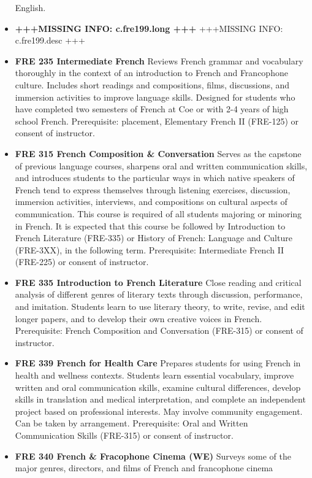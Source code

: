 \documentclass[
  letterpaper,
]{scrbook}
\begin{document}
\begin{itemize}
  English.
\item
  \textbf{+++MISSING INFO: c.fre199.long +++} +++MISSING INFO:
  c.fre199.desc +++
\item
  \textbf{FRE 235 Intermediate French} Reviews French grammar and
  vocabulary thoroughly in the context of an introduction to French and
  Francophone culture. Includes short readings and compositions, films,
  discussions, and immersion activities to improve language skills.
  Designed for students who have completed two semesters of French at
  Coe or with 2-4 years of high school French. Prerequisite: placement,
  Elementary French II (FRE-125) or consent of instructor.
\item
  \textbf{FRE 315 French Composition \& Conversation} Serves as the
  capstone of previous language courses, sharpens oral and written
  communication skills, and introduces students to the particular ways
  in which native speakers of French tend to express themselves through
  listening exercises, discussion, immersion activities, interviews, and
  compositions on cultural aspects of communication. This course is
  required of all students majoring or minoring in French. It is
  expected that this course be followed by Introduction to French
  Literature (FRE-335) or History of French: Language and Culture
  (FRE-3XX), in the following term. Prerequisite: Intermediate French II
  (FRE-225) or consent of instructor.
\item
  \textbf{FRE 335 Introduction to French Literature} Close reading and
  critical analysis of different genres of literary texts through
  discussion, performance, and imitation. Students learn to use literary
  theory, to write, revise, and edit longer papers, and to develop their
  own creative voices in French. Prerequisite: French Composition and
  Conversation (FRE-315) or consent of instructor.
\item
  \textbf{FRE 339 French for Health Care} Prepares students for using
  French in health and wellness contexts. Students learn essential
  vocabulary, improve written and oral communication skills, examine
  cultural differences, develop skills in translation and medical
  interpretation, and complete an independent project based on
  professional interests. May involve community engagement. Can be taken
  by arrangement. Prerequisite: Oral and Written Communication Skills
  (FRE-315) or consent of instructor.
\item
  \textbf{FRE 340 French \& Fracophone Cinema (WE)} Surveys some of the
  major genres, directors, and films of French and francophone cinema

\end{itemize}
\end{document}
